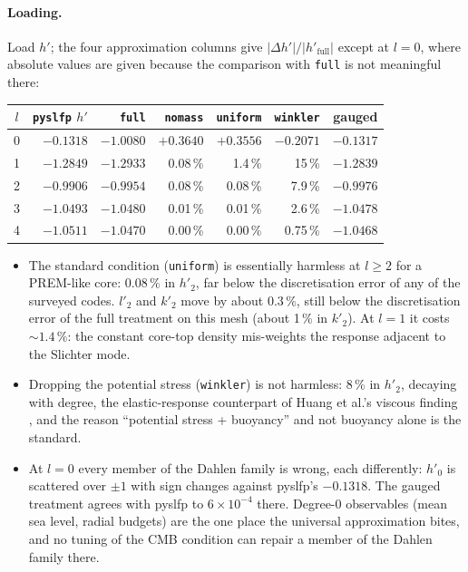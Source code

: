 \documentclass[11pt]{article}
\numberwithin{equation}{section}
\newcommand{\code}[1]{\texttt{#1}}
\begin{document}
\paragraph{Loading.} Load $h'$; the four approximation columns give
$|\Delta h'|/|h'_{\text{full}}|$ except at $l=0$, where absolute values are
given because the comparison with \code{full} is not meaningful there:
\begin{center}
\small
\begin{tabular}{@{}crrrrrr@{}}
\toprule
$l$ & \code{pyslfp} $h'$ & \code{full} & \code{nomass} & \code{uniform} & \code{winkler} & gauged \\
\midrule
0 & $-0.1318$ & $-1.0080$ & $+0.3640$ & $+0.3556$ & $-0.2071$ & $\mathbf{-0.1317}$ \\
1 & $-1.2849$ & $-1.2933$ & 0.08\,\% & 1.4\,\% & 15\,\% & $-1.2839$ \\
2 & $-0.9906$ & $-0.9954$ & 0.08\,\% & 0.08\,\% & 7.9\,\% & $-0.9976$ \\
3 & $-1.0493$ & $-1.0480$ & 0.01\,\% & 0.01\,\% & 2.6\,\% & $-1.0478$ \\
4 & $-1.0511$ & $-1.0470$ & 0.00\,\% & 0.00\,\% & 0.75\,\% & $-1.0468$ \\
\bottomrule
\end{tabular}
\end{center}
\begin{itemize}[leftmargin=*]
\item The standard condition (\code{uniform}) is essentially harmless at
  $l\ge2$ for a PREM-like core: $0.08\,\%$ in $h'_2$, far below the
  discretisation error of any of the surveyed codes. $l'_2$ and $k'_2$
  move by about $0.3\,\%$, still below the discretisation error of the
  full treatment on this mesh (about 1\,\% in $k'_2$). At $l=1$ it costs
  $\sim1.4\,\%$: the constant core-top density mis-weights the response
  adjacent to the Slichter mode.
\item Dropping the potential stress (\code{winkler}) is not harmless: 8\,\%
  in $h'_2$, decaying with degree, the elastic-response counterpart of
  Huang et al.'s viscous finding \cite{Huang2023}, and the reason
  ``potential stress + buoyancy'' and not buoyancy alone is the standard.
\item At $l=0$ every member of the Dahlen family is wrong, each
  differently: $h'_0$ is scattered over $\pm1$ with sign changes against
  pyslfp's $-0.1318$. The gauged treatment agrees with pyslfp to
  $6\times10^{-4}$ there. Degree-0 observables (mean sea level, radial
  budgets) are the one place the universal approximation bites, and no
  tuning of the CMB condition can repair a member of the Dahlen family
  there.
\end{itemize}
\end{document}

